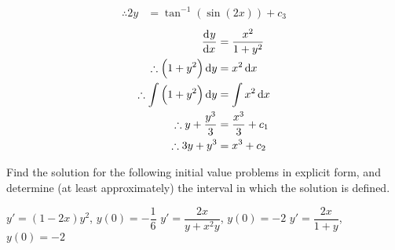 \documentclass[fleqn, a4paper, 12pt, oneside]{amsart}
\theoremstyle{definition}
\theoremstyle{theorem}
\begin{document}
\begin{solution}
\begin{tasks}
\begin{align*}
				\therefore 2y &= \tan^{-1} \left( \sin (2x) \right) + c_3
			\end{align*}
		\task 
			\begin{align*}
				\dod{y}{x} &= \dfrac{x^2}{1 + y^2}\\
				\therefore \left( 1 + y^2 \right) \dif y &= x^2 \dif x\\
				\therefore \int \left( 1 + y^2 \right) \dif y &= \int x^2 \dif x\\
				\therefore y + \dfrac{y^3}{3} &= \dfrac{x^3}{3} + c_1\\
				\therefore 3 y + y^3 &= x^3 + c_2
			\end{align*}
	\end{tasks}
\end{solution}

\begin{question}
	Find the solution for the following initial value problems in explicit form, and determine (at least approximately) the interval in which the solution is defined.
	\begin{tasks}
		\task $y' = (1 - 2x) y^2$, $y(0) = -\dfrac{1}{6}$
		\task $y' = \dfrac{2x}{y + x^2 y}$, $y(0) = -2$
		\task $y' = \dfrac{2x}{1 + y}$, $y(0) = -2$
	\end{tasks}
\end{question}
\end{document}
